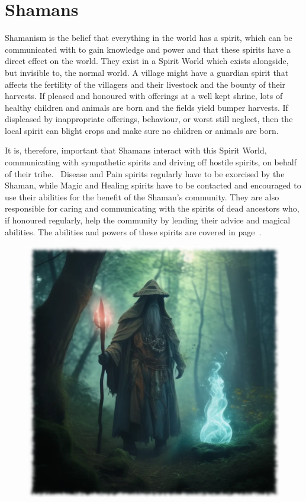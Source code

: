 \section{Shamans}
Shamanism is the belief that everything in the world has a spirit, which can be communicated with to gain knowledge and power and that these spirits have a direct effect on the world. They exist in a Spirit World which exists alongside, but invisible to, the normal world. A village might have a guardian spirit that affects the fertility of the villagers and their livestock and the bounty of their harvests. If pleased and honoured with offerings at a well kept shrine, lots of healthy children and animals are born and the fields yield bumper harvests. If displeased by inappropriate offerings, behaviour, or worst still neglect, then the local spirit can blight crops and make sure no children or animals are born.

It is, therefore, important that Shamans interact with this Spirit World, communicating with sympathetic spirits and driving off hostile spirits, on behalf of their tribe.  Disease and Pain spirits regularly have to be exorcised by the Shaman, while Magic and Healing spirits have to be contacted and encouraged to use their abilities for the benefit of the Shaman’s community. They are also responsible for caring and communicating with the spirits of dead ancestors who, if honoured regularly, help the community by lending their advice and magical abilities. The abilities and powers of these spirits are covered in page~\pageref{sec:spirits}.

\begin{figure}[h]
\begin{center}
\includegraphics[scale=0.23]{img/ai-images/shaman.png}
\end{center}
\end{figure}

